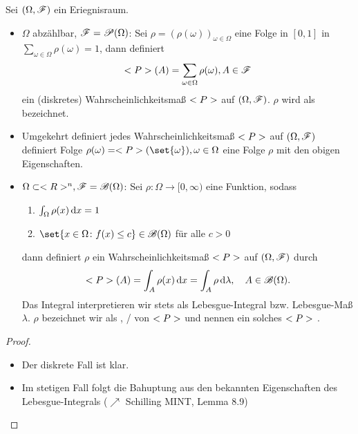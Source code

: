 \begin{proposition}
	Sei $(\Omega, \mathscr{F})$ ein Eriegnisraum.
	\begin{itemize}
		\item $\Omega$ abzählbar, $\mathscr{F} = \mathscr{P}(\Omega)$: Sei $\rho = (\rho(\omega))_{\omega \in \Omega}$ eine Folge in $[0,1]$ in $\sum_{\omega \in \Omega} \rho(\omega) = 1$, dann definiert
		\begin{align}
			<P>(A) = \sum_{\omega \in \Omega} \rho(\omega), A \in \mathscr{F} \notag
		\end{align}
		ein (diskretes) Wahrscheinlichkeitsmaß $<P>$ auf $(\Omega, \mathscr{F})$. $\rho$ wird als  bezeichnet.
		\item Umgekehrt definiert jedes Wahrscheinlichkeitsmaß $<P>$ auf $(\Omega, \mathscr{F})$ definiert Folge $\rho(\omega) = \probp(\set{\omega}), \omega \in \Omega$ eine Folge $\rho$ mit den obigen Eigenschaften.
		\item $\Omega \subset <R>^n, \mathscr{F} = \mathscr{B}(\Omega)$: Sei $\rho: \Omega \to [0, \infty)$ eine Funktion, sodass
		\begin{enumerate}
			\item $\int_{\Omega} \rho(x)\,\mathrm{d} x = 1$
			\item $\set{x \in \Omega \colon f(x) \le c} \in \mathscr{B}(\Omega)$ für alle $c > 0$ 
		\end{enumerate}
		dann definiert $\rho$ ein Wahrscheinlichkeitsmaß $<P>$ auf $(\Omega, \mathscr{F})$ durch 
		\begin{align}
		<P>(A) = \int_{A} \rho(x) \,\mathrm{d} x = \int_{A} \rho \,\mathrm{d} \lambda, \quad A \in \mathscr{B}(\Omega).\notag
		\end{align}
		Das Integral interpretieren wir stets als Lebesgue-Integral bzw. Lebesgue-Maß $\lambda$.
		$\rho$ bezeichnet wir als , / von $<P>$ und nennen ein solches $<P>$ .
	\end{itemize}
\end{proposition}

\begin{proof}
	\begin{itemize}
		\item Der diskrete Fall ist klar.
		\item Im stetigen Fall folgt die Bahuptung aus den bekannten Eigenschaften des Lebesgue-Integrals ($\nearrow$ Schilling MINT, Lemma 8.9)
	\end{itemize}
\end{proof}

